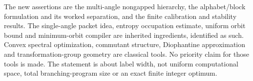 The new assertions are the multi-angle nongapped hierarchy, the alphabet/block formulation and its worked separation, and the finite calibration and stability results. The single-angle packet idea, entropy occupation estimate, uniform orbit bound and minimum-orbit compiler are inherited ingredients, identified as such. Convex spectral optimization, commutant structure, Diophantine approximation and transformation-group geometry are classical tools. No priority claim for those tools is made. The statement is about label width, not uniform computational space, total branching-program size or an exact finite integer optimum.

